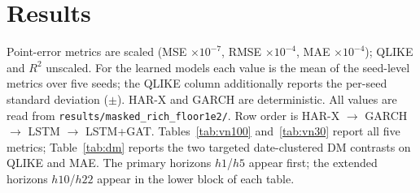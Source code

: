 \documentclass[runningheads]{llncs}
\begin{document}
\section{Results}
Point-error metrics are scaled (MSE $\times10^{-7}$, RMSE $\times10^{-4}$, MAE $\times10^{-4}$); QLIKE and
$R^2$ unscaled. For the learned models each value is the mean of the seed-level metrics over five seeds; the
QLIKE column additionally reports the per-seed standard deviation ($\pm$). HAR-X and GARCH are deterministic.
All values are read from \texttt{results/masked\_rich\_floor1e2/}. Row order is
HAR-X $\to$ GARCH $\to$ LSTM $\to$ LSTM+GAT. Tables~\ref{tab:vn100} and~\ref{tab:vn30} report all five metrics;
Table~\ref{tab:dm} reports the two targeted date-clustered DM contrasts on QLIKE and MAE. The primary horizons
$h1$/$h5$ appear first; the extended horizons $h10$/$h22$ appear in the lower block of each table.
\end{document}
